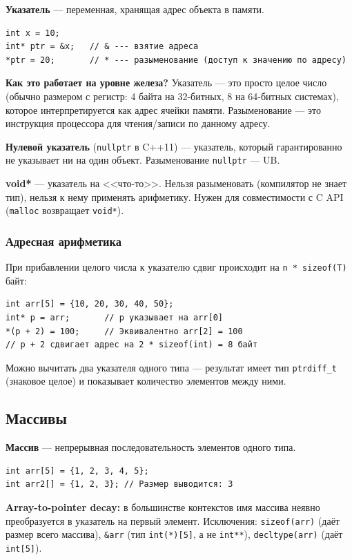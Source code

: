 \documentclass[12pt,a4paper]{article}
\begin{document}
\textbf{Указатель} --- переменная, хранящая адрес объекта в памяти.

\begin{lstlisting}
int x = 10;
int* ptr = &x;   // & --- взятие адреса
*ptr = 20;       // * --- разыменование (доступ к значению по адресу)
\end{lstlisting}

\textbf{Как это работает на уровне железа?} Указатель --- это просто целое число (обычно размером с регистр: 4 байта на 32-битных, 8 на 64-битных системах), которое интерпретируется как адрес ячейки памяти. Разыменование --- это инструкция процессора для чтения/записи по данному адресу.

\textbf{Нулевой указатель} (\texttt{nullptr} в C++11) --- указатель, который гарантированно не указывает ни на один объект. Разыменование \texttt{nullptr} --- UB.

\textbf{void*} --- указатель на <<что-то>>. Нельзя разыменовать (компилятор не знает тип), нельзя к нему применять арифметику. Нужен для совместимости с C API (\texttt{malloc} возвращает \texttt{void*}).

\subsubsection{Адресная арифметика}
При прибавлении целого числа к указателю сдвиг происходит на \texttt{n * sizeof(T)} байт:
\begin{lstlisting}
int arr[5] = {10, 20, 30, 40, 50};
int* p = arr;       // p указывает на arr[0]
*(p + 2) = 100;     // Эквивалентно arr[2] = 100
// p + 2 сдвигает адрес на 2 * sizeof(int) = 8 байт
\end{lstlisting}

Можно вычитать два указателя одного типа --- результат имеет тип \texttt{ptrdiff\_t} (знаковое целое) и показывает количество элементов между ними.

\subsection{Массивы}

\textbf{Массив} --- непрерывная последовательность элементов одного типа.

\begin{lstlisting}
int arr[5] = {1, 2, 3, 4, 5};
int arr2[] = {1, 2, 3}; // Размер выводится: 3
\end{lstlisting}

\textbf{Array-to-pointer decay:} в большинстве контекстов имя массива неявно преобразуется в указатель на первый элемент. Исключения: \texttt{sizeof(arr)} (даёт размер всего массива), \texttt{\&arr} (тип \texttt{int(*)[5]}, а не \texttt{int**}), \texttt{decltype(arr)} (даёт \texttt{int[5]}).
\end{document}
